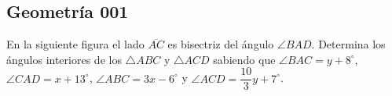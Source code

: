 \documentclass[12pt, a5paper]{article}
\begin{document}
\subsection*{Geometría 001}
\noindent En la siguiente figura el lado $\overline{AC}$ es bisectriz del ángulo $\angle BAD$. Determina los ángulos interiores de los $\triangle ABC$ y $\triangle ACD$ sabiendo que $\angle BAC = y + 8^{\circ}$, $\angle CAD = x + 13^{\circ}$, $\angle ABC = 3x - 6^{\circ}$  y $\angle ACD = \dfrac{10}{3} y + 7^{\circ}$.
\end{document}
